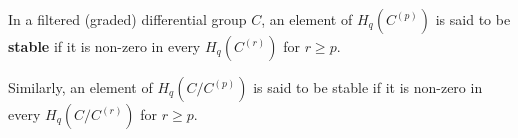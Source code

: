In a filtered (graded) differential group $C$, an element of $H_q(C^{(p)})$ is said to be \textbf{stable} if it is non-zero in every $H_q(C^{(r)})$ for $r \geq p$.

Similarly, an element of $H_q(C/C^{(p)})$ is said to be stable if it is non-zero in every $H_q(C/C^{(r)})$ for $r \geq p$.
